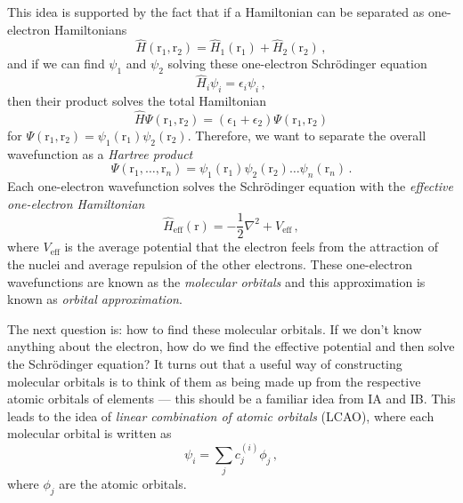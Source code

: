 \documentclass{article}
\theoremstyle{plain}\theoremheaderfont{\normalfont\itshape}\theorembodyfont{\rmfamily}\theoremseparator{.}\newtheorem*{rem}{Remark}\newtheorem*{ex}{Example}\newtheorem*{proof}{Proof}\newtheorem*{altp}{Alternative proof}
\theoremstyle{plain}\theoremheaderfont{\normalfont\bfseries}\theorembodyfont{\rmfamily}\theoremseparator{.}\newtheorem{thm}{Theorem}[section]\newtheorem{lem}[thm]{Lemma}\newtheorem{prop}[thm]{Proposition}\newtheorem*{cor}{Corollary}\newtheorem{defn}[thm]{Definition}\newtheorem{clm}[thm]{Claim}\newtheorem{clminproof}{Claim}\newtheorem{pos}{Postulate}[section]
\theoremstyle{break}\theoremheaderfont{\normalfont\itshape}\theorembodyfont{\rmfamily}\theoremseparator{.\medskip}\newtheorem*{proofskip}{Proof}\newtheorem*{exs}{Examples}\newtheorem*{rems}{Remarks}
\theoremstyle{break}\theoremheaderfont{\normalfont\bfseries}\theorembodyfont{\rmfamily}\theoremseparator{.\medskip}\newtheorem{lemskip}[thm]{Lemma}\newtheorem{defnskip}[thm]{Definition}\newtheorem{propskip}[thm]{Proposition}\newtheorem{thmskip}[thm]{Theorem}
\numberwithin{equation}{section}
\newcommand{\vb}[1]{\bm{\mathrm{#1}}}
\newcommand{\laplacian}{\nabla^2}
\begin{document}
    This idea is supported by the fact that if a Hamiltonian can be separated as one-electron Hamiltonians
    \begin{equation}
        \hat{H}(\vb{r}_1,\vb{r}_2)=\hat{H}_1(\vb{r}_1)+\hat{H}_2(\vb{r}_2)\,,
    \end{equation}
    and if we can find \(\psi_1\) and \(\psi_2\) solving these one-electron Schr\"{o}dinger equation
    \begin{equation}
        \hat{H}_i\psi_i=\epsilon_i\psi_i\,,
    \end{equation}
    then their product solves the total Hamiltonian
    \begin{equation}
        \hat{H}\Psi(\vb{r}_1,\vb{r}_2)=(\epsilon_1+\epsilon_2)\Psi(\vb{r}_1,\vb{r}_2)
    \end{equation}
    for \(\Psi(\vb{r}_1,\vb{r}_2)=\psi_1(\vb{r}_1)\psi_2(\vb{r}_2)\). Therefore, we want to separate the overall wavefunction as a \textit{Hartree product}
    \begin{equation}
        \Psi(\vb{r}_1,\dots,\vb{r}_n)=\psi_1(\vb{r}_1)\psi_2(\vb{r}_2)\dots\psi_n(\vb{r}_n)\,.
    \end{equation}
    Each one-electron wavefunction solves the Schr\"{o}dinger equation with the \textit{effective one-electron Hamiltonian}
    \begin{equation}
        \hat{H}_{\text{eff}}(\vb{r})=-\frac{1}{2}\laplacian+V_{\text{eff}}\,,
    \end{equation}
    where \(V_{\text{eff}}\) is the average potential that the electron feels from the attraction of the nuclei and average repulsion of the other electrons. These one-electron wavefunctions are known as the \textit{molecular orbitals} and this approximation is known as \textit{orbital approximation}.

    The next question is: how to find these molecular orbitals. If we don't know anything about the electron, how do we find the effective potential and then solve the Schr\"{o}dinger equation? It turns out that a useful way of constructing molecular orbitals is to think of them as being made up from the respective atomic orbitals of elements --- this should be a familiar idea from IA and IB. This leads to the idea of \textit{linear combination of atomic orbitals} (LCAO), where each molecular orbital is written as
    \begin{equation}
        \psi_i=\sum_{j}c_{j}^{(i)}\phi_j\,,
    \end{equation}
    where \(\phi_j\) are the atomic orbitals.
\end{document}
